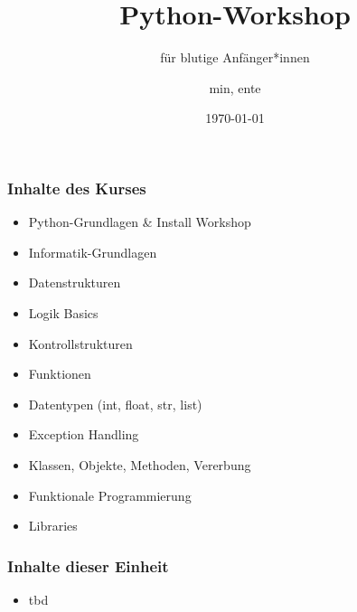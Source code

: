 \documentclass{beamer}
\title{Python-Workshop}
\subtitle{für blutige Anfänger*innen}
\author{min, ente}
\institute{Metalab Institute of Technology}
\date{\today}
\begin{document}
\begin{frame}
\titlepage
\end{frame}


%
%

\begin{frame}
\frametitle{Inhalte des Kurses}
\begin{itemize}
	\item Python-Grundlagen \& Install Workshop
	\item Informatik-Grundlagen
	\item Datenstrukturen
	\item Logik Basics
	\item Kontrollstrukturen
	\item Funktionen
	\item Datentypen (int, float, str, list)
	\item Exception Handling
	\item Klassen, Objekte, Methoden, Vererbung
	\item Funktionale Programmierung
	\item Libraries
\end{itemize}
\end{frame}

\begin{frame}
\frametitle{Inhalte dieser Einheit}
\begin{itemize}
	\item		tbd
\end{itemize}
\end{frame}
\end{document}
